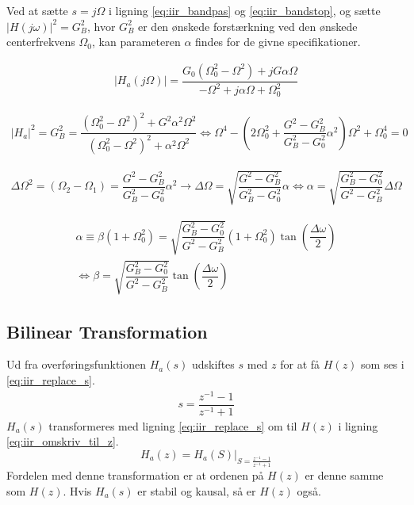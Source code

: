     Ved at sætte $s = j \Omega$ i ligning \ref{eq:iir_bandpas} og \ref{eq:iir_bandstop}, og sætte $\big| H(j\omega)\big|^2 = G_B^2$, hvor $G_B^2$ er den ønskede forstærkning ved den ønskede centerfrekvens $\Omega_0$, kan parameteren $\alpha$ findes for de givne specifikationer.

    \begin{align}
     |H_{a}(j \Omega)| = \dfrac{G_0 (\Omega_0^2- \Omega^2)+ j G \alpha \Omega}{-\Omega^2 + j \alpha \Omega + \Omega_0^2}   
    \end{align}

    \begin{align}
        |H_{a}|^2 = G_B^2 =  \dfrac{(\Omega_0^2- \Omega^2)^2 + G^2 \alpha^2 \Omega^2}{(\Omega_0^2-\Omega^2)^2 +\alpha^2 \Omega^2}   \iff \Omega^4 - \left(2 \Omega_0^2 + \dfrac{G^2- G_B^2}{G_B^2- G_0^2} \alpha^2 \right) \Omega^2 + \Omega_0^4 =0
    \end{align}
    
    
    \begin{align}
       \Delta \Omega^2 = (\Omega_2 - \Omega_1 ) = \dfrac{G^2 - G_B^2}{G_B^2 - G_0^2}  \alpha^2 \rightarrow \Delta \Omega = \sqrt{\dfrac{G^2 - G_B^2}{G_B^2 - G_0^2}} \alpha \iff \alpha = \sqrt{\dfrac{G_B^2-G_0^2}{G^2 - G_B^2 }} \Delta \Omega
    \end{align}


    \begin{align}
    \alpha \equiv \beta (1 + \Omega_0^2)  = \sqrt{\dfrac{G_B^2-G_0^2}{G^2 - G_B^2 }} \left( 1 + \Omega_0^2 \right) \tan \left( \dfrac{\Delta \omega}{2} \right) \\
    \iff \beta = \sqrt{\dfrac{G_B^2-G_0^2}{G^2 - G_B^2 }} \tan \left( \dfrac{\Delta \omega}{2} \right) \label{eq:beta}
    \end{align}


    \subsection{Bilinear Transformation}
    Ud fra overføringsfunktionen $H_a(s)$ udskiftes $s$ med $z$ for at få $H(z)$ som ses i \ref{eq:iir_replace_s}.
    \begin{align}
    s =   \dfrac{z^{-1} - 1}{z^{-1} + 1} \label{eq:iir_replace_s}
    \end{align}
	$H_a(s)$ transformeres med ligning \ref{eq:iir_replace_s} om til $H(z)$ i ligning \ref{eq:iir_omskriv_til_z}.
    \begin{equation}
    H_a(z) = H_a(S)\bigg|_{S = \frac{z^{-1} -1 }{z^{-1} + 1}} \label{eq:iir_omskriv_til_z}
    \end{equation}
    Fordelen med denne transformation er at ordenen på $H(z)$ er denne samme som $H(z)$. Hvis $H_a(s)$ er stabil og kausal, så er $H(z)$ også.
    
